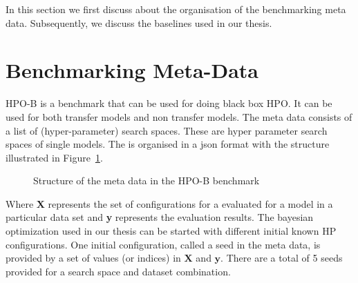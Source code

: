 \documentclass[11pt]{report}
\begin{document}
In this section we first discuss about the organisation of the benchmarking meta data.
Subsequently, we discuss the baselines used in our thesis.


\section{Benchmarking Meta-Data}

HPO-B is a benchmark that can be used for doing black box HPO.
It can be used for both transfer models and non transfer models.
The meta data consists of a list of (hyper-parameter) search spaces.
These are hyper parameter search spaces of single models.
The is organised in a json format with the structure illustrated in Figure~\ref{fig:metadataorganization}.

\begin{figure}[htb]
\centering
{}
\caption{Structure of the meta data in the HPO-B benchmark}
\label{fig:metadataorganization}
\end{figure}
Where \textbf{X} represents the set of configurations for a evaluated for a model in a particular data set and
\textbf{y} represents the evaluation results.
The bayesian optimization used in our thesis can be started with different initial known HP configurations.
One initial configuration, called a seed in the meta data, is provided by a set of values (or indices) in $\textbf{X}$ and $\textbf{y}$.
There are a total of 5 seeds provided for a search space and dataset combination.
\end{document}
